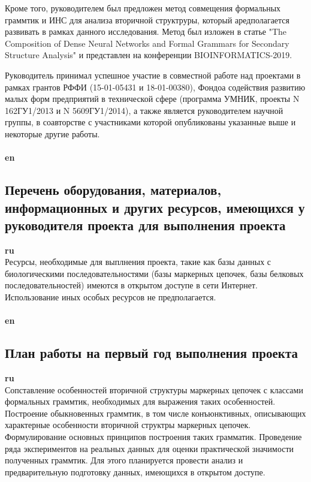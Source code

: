 \documentclass[12pt]{article}  %
\theoremstyle{remark}
\begin{document}
Кроме того, руководителем был предложен метод совмещения формальных граммтик и ИНС для анализа вторичной структруры, который аредполагается развивать в рамках данного исследования. Метод был изложен в статье "The Composition of Dense Neural Networks and Formal Grammars for Secondary Structure Analysis" и представлен на конференции BIOINFORMATICS-2019.

Руководитель принимал успешное участие в совместной работе над проектами в рамках грантов РФФИ (15-01-05431 и 18-01-00380), Фондоа содействия развитию малых форм предприятий в технической сфере
(программа УМНИК, проекты N 162ГУ1/2013 и N 5609ГУ1/2014), а также является руководителем научной группы, в соавторстве с участниками которой опубликованы указанные выше и некоторые другие работы.
\\
\\
\textbf{en}\\

\subsection{Перечень оборудования, материалов, информационных и других ресурсов, имеющихся у руководителя проекта для выполнения проекта }
\textbf{ru}\\
Ресурсы, необходимые для выплнения проекта, такие как базы данных с биологическими последовательностями (базы маркерных цепочек, базы белковых последовательностей) имеются в открытом доступе в сети Интернет.
Использование иных особых ресурсов не предполагается.
\\
\\
\textbf{en}\\


\subsection{План работы на первый год выполнения проекта}

\textbf{ru}\\
Сопставление особенностей вторичной структуры маркерных цепочек с классами формальных граммтик, необходимых для выражения таких особенностей. Построение обыкновенных граммтик, в том числе конъюнктивных, описывающих характерные особенности вторичной структры маркерных цепочек.
Формулирование основных принципов построения таких грамматик.
Проведение ряда экспериментов на реальных данных для оценки практической значимости полученных граммтик. Для этого планируется провести анализ и предварительную подготовку данных, имеющихся в открытом доступе.
\end{document}
